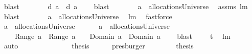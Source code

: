 \begin{isabellebody}
\ blast\isanewline
\ \ \ \ \isamarkupfalse%
\ \isamarkupfalse%
\ {\isachardoublequoteopen}{\isacharquery}d\ {\isacharquery}a{}\ {\isasyminter}\ {\isacharparenleft}{\isacharquery}d\ {\isacharquery}a{}{\isacharparenright}\ {\isacharequal}\ {\isacharbraceleft}{\isacharbraceright}{\isachardoublequoteclose}\ \isamarkupfalse%
\ blast\isanewline
\ \ \ \ \isamarkupfalse%
\ \isamarkupfalse%
\ {\isachardoublequoteopen}{\isacharquery}a{}\ {\isasymin}\ allocationsUniverse{\isachardoublequoteclose}\ \isamarkupfalse%
\ assms{\isacharparenleft}{}{\isacharparenright}\ lm{}{}\ \isamarkupfalse%
\ blast\isanewline
\ \ \ \ \isamarkupfalse%
\ \isamarkupfalse%
\ {\isachardoublequoteopen}{\isacharquery}a{}\ {\isasymin}\ allocationsUniverse{\isachardoublequoteclose}\ \isamarkupfalse%
\ lm{}{}\ \isamarkupfalse%
\ fastforce\isanewline
\ \ \ \ \isamarkupfalse%
\ \isamarkupfalse%
\ {\isachardoublequoteopen}{\isacharquery}a{}\ {\isasymin}\ allocationsUniverse\ {\isacharampersand}\ \isanewline
\ \ \ \ {\isacharquery}a{}\ {\isasymin}\ allocationsUniverse\ {\isacharampersand}\isanewline
\ \ \ \ {\isasymUnion}Range\ {\isacharquery}a{}\ {\isasyminter}\ {\isasymUnion}Range\ {\isacharquery}a{}\ {\isacharequal}\ {\isacharbraceleft}{\isacharbraceright}\ {\isacharampersand}\ Domain\ {\isacharquery}a{}\ {\isasyminter}\ Domain\ {\isacharquery}a{}\ {\isacharequal}\ {\isacharbraceleft}{\isacharbraceright}{\isachardoublequoteclose}\ \isanewline
{}\isamarkupfalse%
\ blast\ \isamarkupfalse%
\ \isamarkupfalse%
\ \isanewline
{\isacharquery}t{}\ \isamarkupfalse%
\ lm{}{}\ \isamarkupfalse%
\ auto\ \ \ \ \ \ \ \isanewline
\ \ \ \ \isamarkupfalse%
\ \isamarkupfalse%
\ {\isacharquery}thesis\ \isamarkupfalse%
\ {}\ {}\ \isamarkupfalse%
\ presburger\isanewline
\ \ \isacommand{{\isacharbraceright}}\isamarkupfalse%
\isanewline
\ \ \isamarkupfalse%
\ \isamarkupfalse%
\ {\isacharquery}thesis\ \isamarkupfalse%
\ {}\ \isamarkupfalse%

\end{isabellebody}

